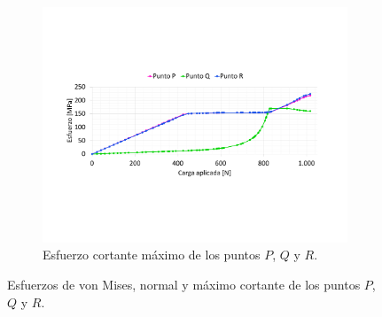 \begin{figure}[h]
	\begin{subfigure}{1\linewidth}
		\centering
		\includegraphics[width=\linewidth, trim={2cm 5cm 2cm 5cm},clip]{Imagenes/esfpqr_ms.pdf}
		\caption{Esfuerzo cortante máximo de los puntos $P$, $Q$ y $R$.}
		\label{fig:defpqr_vmt}
	\end{subfigure}
\caption{Esfuerzos de von Mises, normal y máximo cortante de los puntos $P$, $Q$ y $R$.}
\label{fig:esf_pqr}
\end{figure}